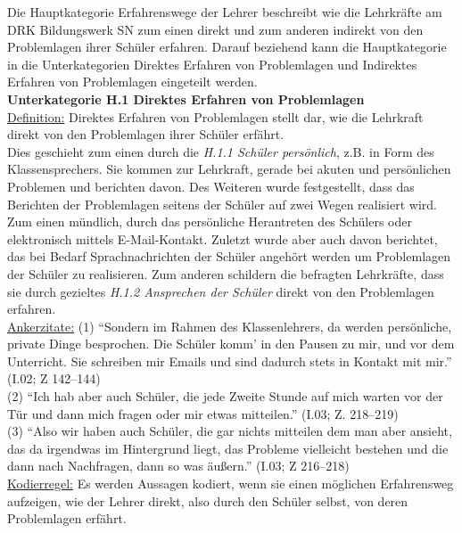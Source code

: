 \noindent
Die Hauptkategorie Erfahrenswege der Lehrer beschreibt wie die Lehrkräfte am DRK Bildungswerk SN zum einen direkt und zum anderen indirekt von den Problemlagen ihrer Schüler erfahren. Darauf beziehend kann die Hauptkategorie in die Unterkategorien Direktes Erfahren von Problemlagen und Indirektes Erfahren von Problemlagen eingeteilt werden.\\

\noindent
\textbf{Unterkategorie H.1 Direktes Erfahren von Problemlagen}\\
\underline{Definition:} Direktes Erfahren von Problemlagen stellt dar, wie die Lehrkraft direkt von den Problemlagen ihrer Schüler erfährt. \\
Dies geschieht zum einen durch die \textit{H.1.1 Schüler persönlich}, z.B. in Form des Klassensprechers. Sie kommen zur Lehrkraft, gerade bei akuten und persönlichen Problemen und berichten davon. Des Weiteren wurde festgestellt, dass das Berichten der Problemlagen seitens der Schüler auf zwei Wegen realisiert wird. Zum einen mündlich, durch das persönliche Herantreten des Schülers oder elektronisch mittels E-Mail-Kontakt. Zuletzt wurde aber auch davon berichtet, das bei Bedarf Sprachnachrichten der Schüler angehört werden um Problemlagen der Schüler zu realisieren. Zum anderen schildern die befragten Lehrkräfte, dass sie durch gezieltes \textit{H.1.2 Ansprechen der Schüler} direkt von den Problemlagen erfahren.\\
\underline{Ankerzitate:} (1) "`Sondern im Rahmen des Klassenlehrers, da werden persönliche, private Dinge besprochen. Die Schüler komm' in den Pausen zu mir, und vor dem Unterricht. Sie schreiben mir Emails und sind dadurch stets in Kontakt mit mir."' (I.02; Z 142--144)\\ (2) "`Ich hab aber auch Schüler, die jede Zweite Stunde auf mich warten vor der Tür und dann mich fragen oder mir etwas mitteilen."' (I.03; Z. 218--219)\\ (3) "`Also wir haben auch Schüler, die gar nichts mitteilen dem man aber ansieht, das da irgendwas im Hintergrund liegt, das Probleme vielleicht bestehen und die dann nach Nachfragen, dann so was äußern."' (I.03; Z 216--218)\\
\underline{Kodierregel:} Es werden Aussagen kodiert, wenn sie einen möglichen Erfahrensweg aufzeigen, wie der Lehrer direkt, also durch den Schüler selbst, von deren Problemlagen erfährt.\\

